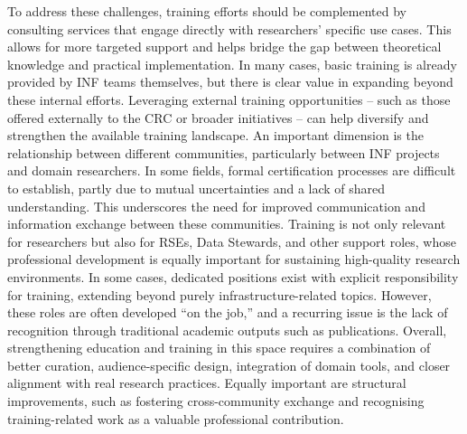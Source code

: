 \documentclass{eceasst}
\begin{document}
To address these challenges, training efforts should be complemented by consulting services that engage directly with researchers’ specific use cases.
This allows for more targeted support and helps bridge the gap between theoretical knowledge and practical implementation.
In many cases, basic training is already provided by INF teams themselves, but there is clear value in expanding beyond these internal efforts.
Leveraging external training opportunities -- such as those offered externally to the CRC or broader initiatives -- can help diversify and strengthen the available training landscape.
An important dimension is the relationship between different communities, particularly between INF projects and domain researchers.
In some fields, formal certification processes are difficult to establish, partly due to mutual uncertainties and a lack of shared understanding.
This underscores the need for improved communication and information exchange between these communities.
Training is not only relevant for researchers but also for RSEs, Data Stewards, and other support roles, whose professional development is equally important for sustaining high-quality research environments.
In some cases, dedicated positions exist with explicit responsibility for training, extending beyond purely infrastructure-related topics.
However, these roles are often developed “on the job,” and a recurring issue is the lack of recognition through traditional academic outputs such as publications.
Overall, strengthening education and training in this space requires a combination of better curation,
audience-specific design, integration of domain tools, and closer alignment with real research practices.
Equally important are structural improvements, such as fostering cross-community exchange and recognising training-related work as a valuable professional contribution.
\vspace{-1em}
\end{document}
